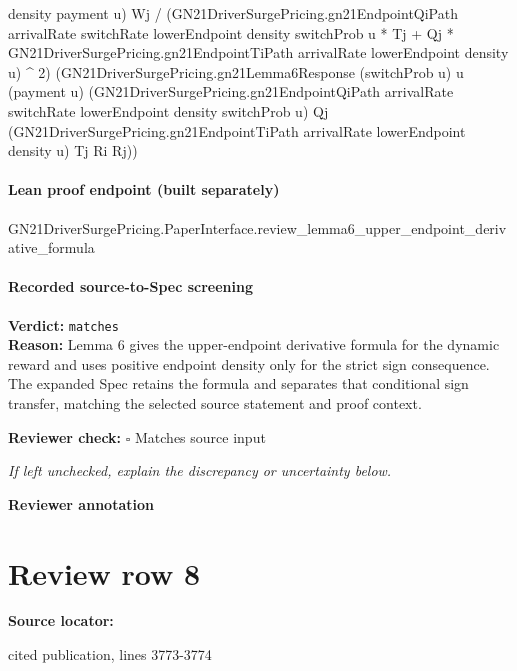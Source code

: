 \documentclass[10pt]{article}
\newcommand{\reviewerbox}{%
  \par\noindent\fbox{\parbox{0.96\linewidth}{\rule{0pt}{0.38in}}}\par
}
\newcommand{\reviewmatch}[1]{%
  \par\noindent\textbf{Reviewer check:} $\square$\; #1\par
  \noindent\emph{If left unchecked, explain the discrepancy or uncertainty below.}\par
}
\begin{document}
\begin{ReviewVerbatim}
                                                  density payment u)
                                                Wj /
                                            (GN21DriverSurgePricing.gn21EndpointQiPath arrivalRate switchRate
                                                    lowerEndpoint density switchProb u *
                                                  Tj +
                                                Qj *
                                                  GN21DriverSurgePricing.gn21EndpointTiPath arrivalRate lowerEndpoint
                                                    density u) ^
                                              2)
                                          (GN21DriverSurgePricing.gn21Lemma6Response (switchProb u) u (payment u)
                                            (GN21DriverSurgePricing.gn21EndpointQiPath arrivalRate switchRate
                                              lowerEndpoint density switchProb u)
                                            Qj
                                            (GN21DriverSurgePricing.gn21EndpointTiPath arrivalRate lowerEndpoint density
                                              u)
                                            Tj Ri Rj))
\end{ReviewVerbatim}

\paragraph{Lean proof endpoint (built separately)}\begin{ReviewVerbatim}
GN21DriverSurgePricing.PaperInterface.review_lemma6_upper_endpoint_derivative_formula
\end{ReviewVerbatim}

\paragraph{Recorded source-to-Spec screening}
\textbf{Verdict:} \texttt{matches}
\\
\textbf{Reason:} Lemma 6 gives the upper-endpoint derivative formula for the dynamic reward and uses positive endpoint density only for the strict sign consequence. The expanded Spec retains the formula and separates that conditional sign transfer, matching the selected source statement and proof context.
\reviewmatch{Matches source input}
\noindent\textbf{Reviewer annotation}\par
\reviewerbox
\clearpage
\hypertarget{source-claim-414ba26e7a98cabd}{}
\section*{Review row 8}
\textbf{Source locator:} {\footnotesize\raggedright cited publication, lines 3773-\allowbreak{}3774\par}
\end{document}
